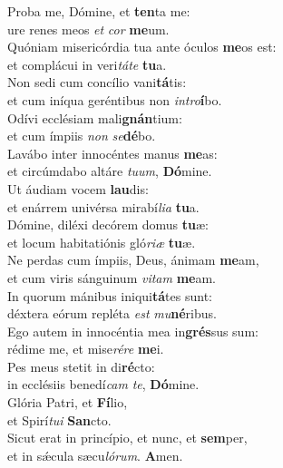 \evenverse Proba me, Dómine, et \textbf{ten}ta me:~\*\\
\evenverse ure renes meos \textit{et} \textit{cor} \textbf{me}um.\\
\oddverse Quóniam misericórdia tua ante óculos \textbf{me}os est:~\*\\
\oddverse et complácui in veri\textit{tá}\textit{te} \textbf{tu}a.\\
\evenverse Non sedi cum concílio vani\textbf{tá}tis:~\*\\
\evenverse et cum iníqua geréntibus non \textit{in}\textit{tro}\textbf{í}bo.\\
\oddverse Odívi ecclésiam mali\textbf{gnán}tium:~\*\\
\oddverse et cum ímpiis \textit{non} \textit{se}\textbf{dé}bo.\\
\evenverse Lavábo inter innocéntes manus \textbf{me}as:~\*\\
\evenverse et circúmdabo altáre \textit{tu}\textit{um}, \textbf{Dó}mine.\\
\oddverse Ut áudiam vocem \textbf{lau}dis:~\*\\
\oddverse et enárrem univérsa mirabí\textit{li}\textit{a} \textbf{tu}a.\\
\evenverse Dómine, diléxi decórem domus \textbf{tu}æ:~\*\\
\evenverse et locum habitatiónis gló\textit{ri}\textit{æ} \textbf{tu}æ.\\
\oddverse Ne perdas cum ímpiis, Deus, ánimam \textbf{me}am,~\*\\
\oddverse et cum viris sánguinum \textit{vi}\textit{tam} \textbf{me}am.\\
\evenverse In quorum mánibus iniqui\textbf{tá}tes sunt:~\*\\
\evenverse déxtera eórum repléta \textit{est} \textit{mu}\textbf{né}ribus.\\
\oddverse Ego autem in innocéntia mea in\textbf{grés}sus sum:~\*\\
\oddverse rédime me, et mise\textit{ré}\textit{re} \textbf{me}i.\\
\evenverse Pes meus stetit in di\textbf{ré}cto:~\*\\
\evenverse in ecclésiis benedí\textit{cam} \textit{te}, \textbf{Dó}mine.\\
\oddverse Glória Patri, et \textbf{Fí}lio,~\*\\
\oddverse et Spirí\textit{tu}\textit{i} \textbf{San}cto.\\
\evenverse Sicut erat in princípio, et nunc, et \textbf{sem}per,~\*\\
\evenverse et in sǽcula sæcu\textit{ló}\textit{rum}. \textbf{A}men.\\
